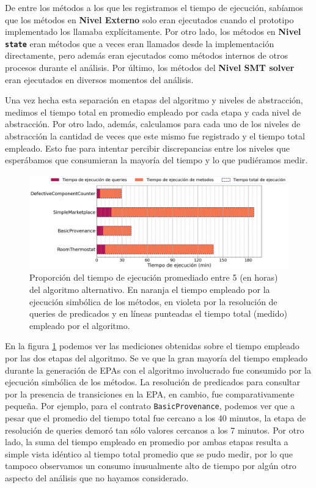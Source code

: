 De  entre los métodos a los que les registramos el tiempo de ejecución, sabíamos que los métodos en \textbf{Nivel Externo} solo eran ejecutados cuando el prototipo implementado los llamaba explícitamente.
Por otro lado, los métodos en \textbf{Nivel \texttt{state}} eran métodos que a veces eran llamados desde la implementación directamente, pero además eran ejecutados como métodos internos de otros procesos durante el análisis.
Por último, los métodos del \textbf{Nivel SMT solver} eran ejecutados en diversos momentos del análisis.

Una vez hecha esta separación en etapas del algoritmo y niveles de abstracción, medimos el tiempo total en promedio empleado por cada etapa y cada nivel de abstracción.
Por otro lado, además, calculamos para cada uno de los niveles de abstracción la cantidad de veces que este mismo fue registrado y el tiempo total empleado.
Esto fue para intentar percibir discrepancias entre los niveles que esperábamos que consumieran la mayoría del tiempo y lo que pudiéramos medir.

\begin{figure}
    \includegraphics[width=\textwidth]{figs/categories-bar-graph.png}
    \caption{Proporción del tiempo de ejecución promediado entre 5 (en horas) del algoritmo alternativo.
        En naranja el tiempo empleado por la ejecución simbólica de los métodos, en violeta por la resolución de queries de predicados y en líneas punteadas el tiempo total (medido) empleado por el algoritmo.}
    \label{fig:tiempo-categorias}
\end{figure}

En la figura \ref{fig:tiempo-categorias} podemos ver las mediciones obtenidas sobre el tiempo empleado por las dos etapas del algoritmo.
Se ve que la gran mayoría del tiempo empleado durante la generación de EPAs con el algoritmo involucrado fue consumido por la ejecución simbólica de los métodos.
La resolución de predicados para consultar por la presencia de transiciones en la EPA, en cambio, fue comparativamente pequeña.
Por ejemplo, para el contrato \texttt{BasicProvenance}, podemos ver que a pesar que el promedio del tiempo total fue cercano a los 40 minutos, la etapa de resolución de queries demoró tan sólo valores cercanos a los 7 minutos.
Por otro lado, la suma del tiempo empleado en promedio por ambas etapas resulta a simple vista idéntico al tiempo total promedio que se pudo medir, por lo que tampoco observamos un consumo inusualmente alto de tiempo por algún otro aspecto del análisis que no hayamos considerado.

